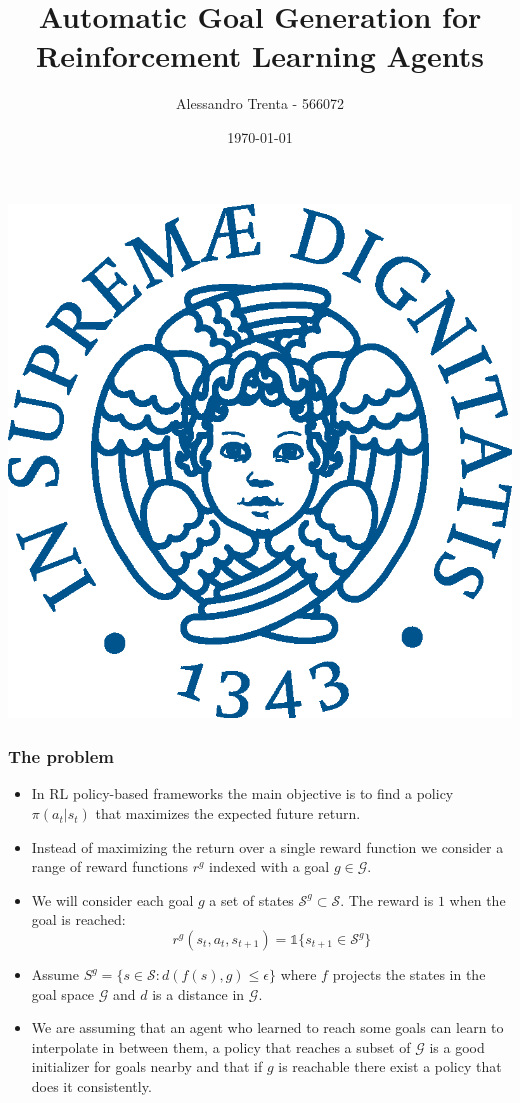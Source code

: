 \documentclass{beamer}
\title[Automatic Goal Generation for RL]{Automatic Goal Generation for Reinforcement Learning Agents} %
\author[Alessandro Trenta]{Alessandro Trenta - 566072} %
\institute[UniPi] %
{ISPR - Dip. of Informatics \\ Università di Pisa %
}
\date{\today} %
\theoremstyle{plain}
\theoremstyle{definition}
\theoremstyle{remark}
\begin{document}
\begin{frame}[plain]
\begin{center}
	\includegraphics[width=0.25\linewidth]{Logo/cherubino_pant541}
\end{center}
\titlepage %
\end{frame}

\begin{frame}
	\frametitle{The problem}
	\begin{itemize}
		\item In RL policy-based frameworks the main objective is to find a policy $\pi(a_t|s_t)$ that maximizes the expected future return.
		\item Instead of maximizing the return over a single reward function we consider a range of reward functions $r^g$ indexed with a goal $g\in\mathcal{G}$.
  		\item We will consider each goal $g$ a set of states $\mathcal{S}^{g}\subset \mathcal{S}$. The reward is $1$ when the goal is reached:
			\begin{equation*}
				r^{g}(s_t, a_t, s_{t+1}) = \mathds{1}\{s_{t+1} \in \mathcal{S}^{g}\}
			\end{equation*}
		\item Assume $S^{g} = \{s\in \mathcal{S}: d(f(s), g)\leq \epsilon\}$ where $f$ projects the states in the goal space $\mathcal{G}$ and $d$ is a distance in $\mathcal{G}$.
		\item We are assuming that an agent who learned to reach some goals can learn to interpolate in between them, a policy that reaches a subset of $\mathcal{G}$ is a good initializer for goals nearby and that if $g$ is reachable there exist a policy that does it consistently.
	\end{itemize}
\end{frame}
\end{document}
